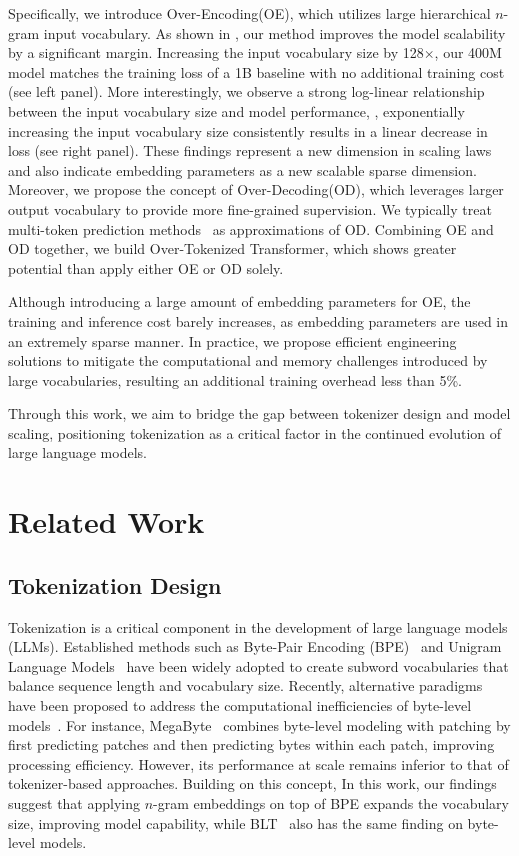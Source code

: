 Specifically, we introduce Over-Encoding(OE), which utilizes large hierarchical $n$-gram input vocabulary. As shown in , our method improves the model scalability by a significant margin. Increasing the input vocabulary size by 128$\times$, our 400M model matches the training loss of a 1B baseline with no additional training cost (see left panel). More interestingly, we observe a strong log-linear relationship between the input vocabulary size and model performance, \ie, exponentially increasing the input vocabulary size consistently results in a linear decrease in loss (see right panel). These findings represent a new dimension in scaling laws and also indicate embedding parameters as a new scalable sparse dimension. Moreover, we propose the concept of Over-Decoding(OD), which leverages larger output vocabulary to provide more fine-grained supervision. We typically treat multi-token prediction methods~\cite{gloeckle2024better,deepseekai2024deepseekv3technicalreport} as approximations of OD. Combining OE and OD together, we build Over-Tokenized Transformer, which shows greater potential than apply either OE or OD solely.

Although introducing a large amount of embedding parameters for OE, the training and inference cost barely increases, as embedding parameters are used in an extremely sparse manner. In practice, we propose efficient engineering solutions to mitigate the computational and memory challenges introduced by large vocabularies, resulting an additional training overhead less than 5\%. 

Through this work, we aim to bridge the gap between tokenizer design and model scaling, positioning tokenization as a critical factor in the continued evolution of large language models.

\section{Related Work}

\subsection{Tokenization Design}
Tokenization is a critical component in the development of large language models (LLMs). Established methods such as Byte-Pair Encoding (BPE)~\cite{sennrich2015neural} and Unigram Language Models~\cite{kudo2018subword} have been widely adopted to create subword vocabularies that balance sequence length and vocabulary size. Recently, alternative paradigms have been proposed to address the computational inefficiencies of byte-level models~\cite{xue-etal-2022-byt5,clark2022canine,tay2022charformer,yu2023megabyte}. For instance, MegaByte~\cite{yu2023megabyte} combines byte-level modeling with patching by first predicting patches and then predicting bytes within each patch, improving processing efficiency. However, its performance at scale remains inferior to that of tokenizer-based approaches. Building on this concept, 
In this work, our findings suggest that applying $n$-gram embeddings on top of BPE expands the vocabulary size, improving model capability, while BLT~\cite{pagnoni2024bytelatenttransformerpatches} also has the same finding on byte-level models.


